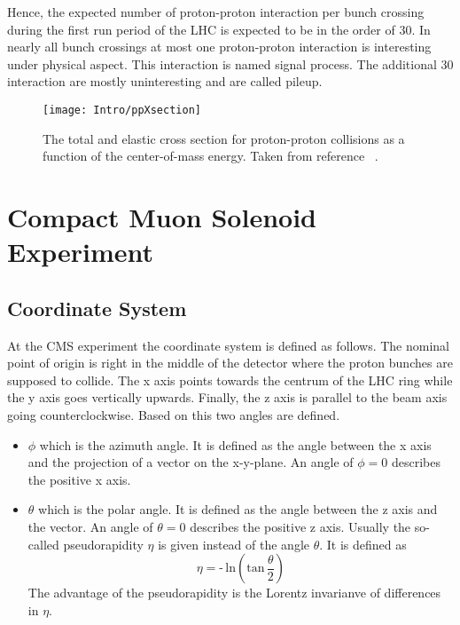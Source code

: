 Hence, the expected number of proton-proton interaction per bunch crossing during the first run period of the LHC is expected to be in the order of 30. In nearly all bunch crossings at most one proton-proton interaction is interesting under physical aspect. This interaction is named signal process. The additional 30 interaction are mostly uninteresting and are called pileup.

\begin{figure}[!Hhtb]
    \centering
    \texttt{[image: Intro/ppXsection]}
    \caption[Total and elastic cross section for pp interactions]{The total and elastic cross section for proton-proton collisions as a function of the center-of-mass energy. Taken from reference ~.\label{plot:IntroTotalCross}}
\end{figure}

\section{Compact Muon Solenoid Experiment \label{LHCCMSCMS}}

\subsection{Coordinate System \label{LCHCMSCoordSys}}

At the CMS experiment the coordinate system is defined as follows. The nominal point of origin is right in the middle of the detector where the proton bunches are supposed to collide. The x axis points towards the centrum of the LHC ring while the y axis goes vertically upwards. Finally, the z axis is parallel to the beam axis going counterclockwise. Based on this two angles are defined.
\begin{itemize}
    \item{$\phi{}$} which is the azimuth angle. It is defined as the angle between the x axis and the projection of a vector on the x-y-plane. An angle of $\phi{} = 0$ describes the positive x axis.
    \item{$\theta{}$} which is the polar angle. It is defined as the angle between the z axis and the vector. An angle of $\theta{} = 0$ describes the positive z axis. Usually the so-called pseudorapidity $\eta{}$ is given instead of the angle $\theta$. It is defined as
    \begin{equation}
        \eta{} = \textrm{-}\,{}\textrm{ln} \left( \textrm{tan}\,{}\frac{\theta{}}{2}\right)
        \label{eq:pseudorapidity}
    \end{equation}
    The advantage of the pseudorapidity is the Lorentz invarianve of differences in $\eta{}$.
\end{itemize}

